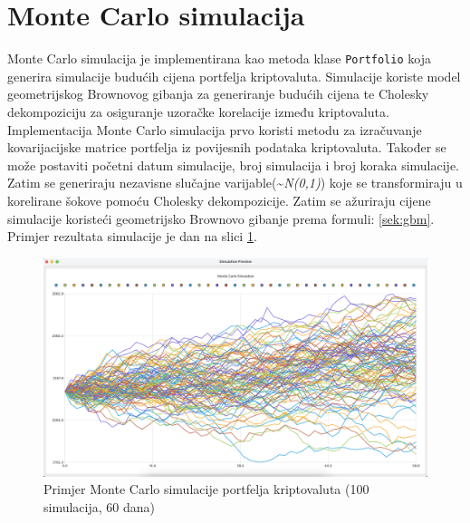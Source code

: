 \documentclass[zavrsnirad]{fer}
\begin{document}
\section{Monte Carlo simulacija}
\label{sek:monte_carlo_simulacija}
Monte Carlo simulacija je implementirana kao metoda klase
\texttt{Portfolio} koja generira simulacije budućih cijena portfelja
kriptovaluta. Simulacije koriste model geometrijskog Brownovog gibanja
za generiranje budućih cijena te Cholesky dekompoziciju za
osiguranje uzoračke korelacije između kriptovaluta.
Implementacija Monte Carlo simulacija prvo koristi metodu za izračuvanje
kovarijacijske matrice portfelja iz povijesnih podataka kriptovaluta.
Također se može postaviti početni datum simulacije, broj simulacija i
broj koraka simulacije.
Zatim se generiraju nezavisne slučajne varijable(\textasciitilde \textit{N(0,1)}) koje se
transformiraju u korelirane šokove pomoću Cholesky dekompozicije.
Zatim se ažuriraju cijene simulacije koristeći geometrijsko Brownovo gibanje
prema formuli:
\ref{sek:gbm}. Primjer rezultata simulacije je dan na slici
\ref{fig:monte_carlo_example}.
\begin{figure}[ht]
    \centering
    \includegraphics[width=1.5\textwidth]{Figures/monte_carlo_example.png}
    \caption{Primjer Monte Carlo simulacije portfelja kriptovaluta (100
    simulacija, 60 dana)}
    \label{fig:monte_carlo_example}
\end{figure}




\begin{lstlisting}
\end{lstlisting}
\end{document}
